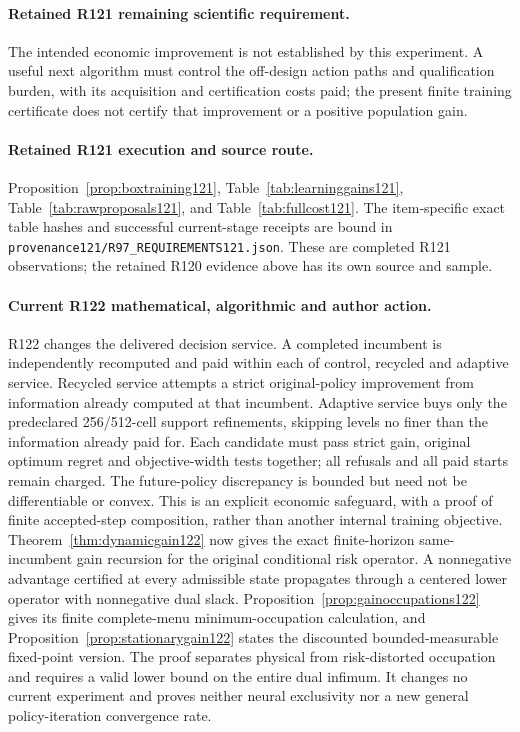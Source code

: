 \paragraph{Retained R121 remaining scientific requirement.}
The intended economic improvement is not established by this experiment. A useful next algorithm must control the off-design action paths and qualification burden, with its acquisition and certification costs paid; the present finite training certificate does not certify that improvement or a positive population gain.

\paragraph{Retained R121 execution and source route.}
Proposition~\ref{prop:boxtraining121}, Table~\ref{tab:learninggains121}, Table~\ref{tab:rawproposals121}, and Table~\ref{tab:fullcost121}.
The item-specific exact table hashes and successful current-stage receipts are bound in \nolinkurl{provenance121/R97_REQUIREMENTS121.json}. These are completed R121 observations; the retained R120 evidence above has its own source and sample.
\paragraph{Current R122 mathematical, algorithmic and author action.}
R122 changes the delivered decision service. A completed incumbent is independently recomputed and paid within each of control, recycled and adaptive service. Recycled service attempts a strict original-policy improvement from information already computed at that incumbent. Adaptive service buys only the predeclared 256/512-cell support refinements, skipping levels no finer than the information already paid for. Each candidate must pass strict gain, original optimum regret and objective-width tests together; all refusals and all paid starts remain charged. The future-policy discrepancy is bounded but need not be differentiable or convex. This is an explicit economic safeguard, with a proof of finite accepted-step composition, rather than another internal training objective. Theorem~\ref{thm:dynamicgain122} now gives the exact finite-horizon same-incumbent gain recursion for the original conditional risk operator. A nonnegative advantage certified at every admissible state propagates through a centered lower operator with nonnegative dual slack. Proposition~\ref{prop:gainoccupations122} gives its finite complete-menu minimum-occupation calculation, and Proposition~\ref{prop:stationarygain122} states the discounted bounded-measurable fixed-point version. The proof separates physical from risk-distorted occupation and requires a valid lower bound on the entire dual infimum. It changes no current experiment and proves neither neural exclusivity nor a new general policy-iteration convergence rate.

